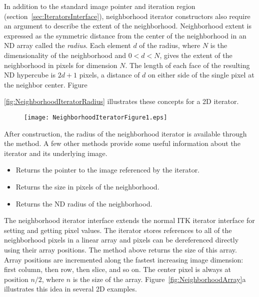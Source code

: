 In addition to the standard image pointer and iteration region
(section~\ref{sec:IteratorsInterface}), neighborhood iterator constructors also
require an argument to describe the extent of the neighborhood.  Neighborhood
extent is expressed as the symmetric distance from the center of the
neighborhood in an ND array called the \emph{radius}. Each element $d$ of the
radius, where $N$ is the dimensionality of the neighborhood and $0 < d < N$,
gives the extent of the neighborhood in pixels for dimension $N$.  The length
of each face of the resulting ND hypercube is $2d + 1$ pixels, a distance of
$d$ on either side of the single pixel at the neighbor center.
Figure~{\ref{fig:NeighborhoodIteratorRadius} illustrates these concepts for a
2D iterator.

\begin{figure}
\centering
\texttt{[image: NeighborhoodIteratorFigure1.eps]}
\protect\label{fig:WalkingNeighborhoodIterator}
\end{figure}

After construction, the radius of the neighborhood iterator is available
through the  method.  A few other methods provide some useful
information about the iterator and its underlying image.

\begin{itemize}

\item \textbf{} Returns the pointer to
the image referenced by the iterator.

\item \textbf{} Returns the size in pixels of the
neighborhood.

\item \textbf{} Returns the ND radius of the
neighborhood.

\end{itemize}


The neighborhood iterator interface extends the normal ITK iterator interface
for setting and getting pixel values.  The iterator stores references to all of
the neighborhood pixels in a linear array and pixels can be dereferenced
directly using their array positions.  The  method above returns the
size of this array.  Array positions are incremented along the fastest
increasing image dimension: first column, then row, then slice, and so on.  The
center pixel is always at position $n/2$, where $n$ is the size of the array.
Figure~\ref{fig:NeighborhoodArray}a illustrates this idea in several 2D
examples.

}
